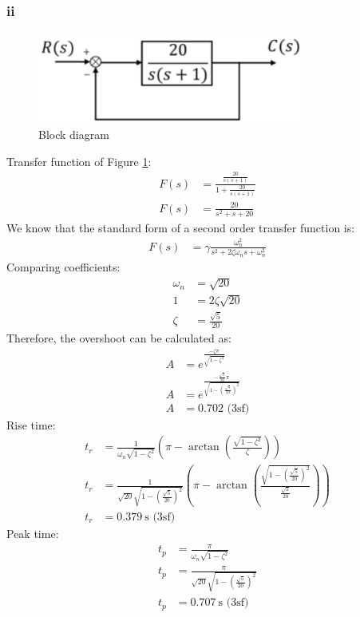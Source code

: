 \documentclass[11pt]{article}
\numberwithin{equation}{section}
\begin{document}
\subsubsection{ii}
\begin{figure}[H]
    \centering
    \includegraphics[height = 3cm]{./img/q1cii1.png}
    \caption{Block diagram}
    \label{fig:q1cii1}
\end{figure}
Transfer function of Figure \ref{fig:q1cii1}:
\begin{align}
    F(s) &= \frac{\frac{20}{s(s+1)}}{1 + \frac{20}{s(s+1)}}\\
    F(s) &= \frac{20}{s^2 + s + 20 }
\end{align}
We know that the standard form of a second order transfer function is: 
\begin{align}
    F(s) &= \gamma\frac{\omega_n^2}{s^2 + 2\zeta \omega_n s +  \omega_n^2}
\end{align}
Comparing coefficients:
\begin{align}
    \omega_n &= \sqrt{20}\\
    1&= 2\zeta \sqrt{20}\\
    \zeta &= \frac{\sqrt{5}}{20}
\end{align}
Therefore, the overshoot can be calculated as:
\begin{align}
    A &= e^{\frac{-\zeta \pi}{\sqrt{1-\zeta^2}}}\\
    A &= e^{\frac{-\frac{\sqrt{5}}{20} \pi}{\sqrt{1-\left(\frac{\sqrt{5}}{20}\right)^2}}}\\
    A &= 0.702 \textrm{ (3sf)}
\end{align}
Rise time:
\begin{align}
    t_r &= \frac{1}{\omega_n \sqrt{1- \zeta^2}} \left(\pi - \arctan\left(\frac{\sqrt{1-\zeta^2}}{\zeta}\right)\right)\\
    t_r &= \frac{1}{\sqrt{20} \sqrt{1- \left(\frac{\sqrt{5}}{20}\right)^2}} \left(\pi - \arctan\left(\frac{\sqrt{1-\left(\frac{\sqrt{5}}{20}\right)^2}}{\frac{\sqrt{5}}{20}}\right)\right)\\
    t_r &= \SI{0.379}{\second} \textrm{ (3sf)}
\end{align}
Peak time:
\begin{align}
    t_p &= \frac{\pi}{\omega_n \sqrt{1- \zeta^2}}\\
    t_p &= \frac{\pi}{\sqrt{20} \sqrt{1- \left(\frac{\sqrt{5}}{20}\right)^2}}\\
    t_p &= \SI{0.707}{\second} \textrm{ (3sf)}
\end{align}
\end{document}
